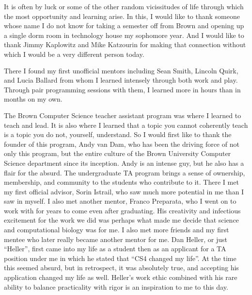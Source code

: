 
\begin{acknowledgements}      


It is often by luck or some of the other random vicissitudes of life through which the most opportunity and learning arise. In this, I would like to thank someone whose name I do not know for taking a semester off from Brown and opening up a single dorm room in technology house my sophomore year. And I would like to thank Jimmy Kaplowitz and Mike Katzourin for making that connection without which I would be a very different person today. 

There I found my first unofficial mentors including Sean Smith, Lincoln Quirk, and Lucia Ballard from whom I learned intensely through both work and play. Through pair programming sessions with them, I learned more in hours than in months on my own. 

The Brown Computer Science teacher assistant program was where I learned to teach and lead. It is also where I learned that a topic you cannot coherently teach is a topic you do not, yourself, understand. So I would first like to thank the founder of this program, Andy van Dam, who has been the driving force of not only this program, but the entire culture of the Brown University Computer Science department since its inception. Andy is an intense guy, but he also has a flair for the absurd. The undergraduate TA program brings a sense of ownership, membership, and community to the students who contribute to it. There I met my first official advisor, Sorin Istrail, who saw much more potential in me than I saw in myself. I also met another mentor, Franco Preparata, who I went on to work with for years to come even after graduating. His creativity and infectious excitement for the work we did was perhaps what made me decide that science and computational biology was for me. I also met more friends and my first mentee who later really became another mentor for me. Dan Heller, or just ``Heller'', first came into my life as a student then as an applicant for a TA position under me in which he stated that ``CS4 changed my life''. At the time this seemed absurd, but in retrospect, it was absolutely true, and accepting his application changed my life as well. Heller's work ethic combined with his rare ability to balance practicality with rigor is an inspiration to me to this day. 


\end{acknowledgements}
